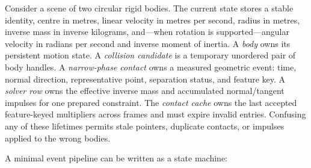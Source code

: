 Consider a scene of two circular rigid bodies. The current state stores a stable identity, centre in metres, linear velocity in metres per second, radius in metres, inverse mass in inverse kilograms, and---when rotation is supported---angular velocity in radians per second and inverse moment of inertia. A \emph{body} owns its persistent motion state. A \emph{collision candidate} is a temporary unordered pair of body handles. A \emph{narrow-phase contact} owns a measured geometric event: time, normal direction, representative point, separation status, and feature key. A \emph{solver row} owns the effective inverse mass and accumulated normal/tangent impulses for one prepared constraint. The \emph{contact cache} owns the last accepted feature-keyed multipliers across frames and must expire invalid entries. Confusing any of these lifetimes permits stale pointers, duplicate contacts, or impulses applied to the wrong bodies.

A minimal event pipeline can be written as a state machine:

